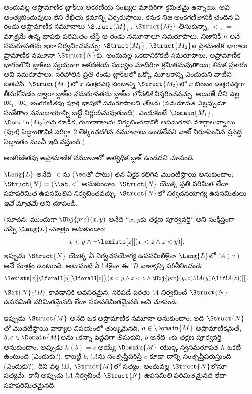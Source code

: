 \documentclass[../../../include/open-logic-section]{subfiles}
\begin{document}
అందువల్ల అప్రామాణిక బ్లాక్‌లు అకరణీయ సంఖ్యల మాదిరిగా క్రమితమై ఉన్నాయి: అవి అంత్యబిందువులు లేని  రేఖీయ క్రమాన్ని ఏర్పరుస్తాయి. కనుక నిజ అంకగణితానికి చెందిన ఏ రెండు  అప్రామాణిక నమూనాలు $\Struct{M}_1$, $\Struct{M_2}$ తీసుకున్నా, $<$, $=$ మాత్రమే ఉన్న భాషకు పరిమితం చేస్తే ఆ రెండు నమూనాలూ సమరూపాలు. నిజానికి $h$ అనే సమరూపతను ఇలా నిర్వచించవచ్చు: $\Struct{M_1}$, $\Struct{M_2}$ల ప్రామాణిక భాగాలు ప్రామాణిక నమూనా $\Struct{N}$కు, అందువల్ల ఒకదానికొకటి సమరూపాలు. అప్రామాణిక భాగంలోని బ్లాక్‌లు స్వయంగా అకరణీయ సంఖ్యల మాదిరిగా క్రమితమవుతాయి; కనుక  ప్రకారం అవి సమరూపాలు. సరిపోలిన ప్రతి రెండు బ్లాక్‌లలో ఒక్కో మూలకాన్ని ఎంచుకుని వాటిని జతచేసి, $\Struct{M_1}$లో $x$ ఉత్తరవర్తి బింబాన్ని $\Struct{M_2}$లో $x$ బింబం ఉత్తరవర్తిగా తీసుకోవడం ద్వారా బ్లాక్‌ల సమరూపతను బ్లాక్‌ల \emph{లోపలికి} విస్తరించవచ్చు. అయితే దీని వల్ల $\mathfrak{M}_1$, $\mathfrak{M}_2$ అంకగణితపు పూర్తి భాషలో సమరూపాలని \emph{తేలదు} (సమరూపత ఎల్లప్పుడూ సంకేతాల సముదాయాన్ని బట్టే నిర్ణయమవుతుంది). ఎందుకంటే $\Domain{M_1}$, $\Domain{M_2}$లపై కూడిక, గుణకారాలను నిర్వచించడానికి అసమరూప మార్గాలున్నాయి. (పూర్తి సిద్ధాంతానికి సరిగ్గా~2 లెక్కించదగిన నమూనాలు ఉండలేవని వాట్ నిరూపించిన ప్రసిద్ధ సిద్ధాంతం నుంచీ ఇది వస్తుంది.)

\begin{prob}
అంకగణితపు అప్రామాణిక నమూనాలో అత్యధిక బ్లాక్ ఉండదని చూపండి.
\end{prob}

\begin{prob}
$\Lang{L}$ అనేది $<$ను ($\eq$తో పాటు) తన ఏకైక  కలిగిన మొదటిస్థాయి  అనుకుందాం; $\Struct{N} = (\Nat,
<)$ అనుకుందాం. $\Struct{N}$ యొక్క ప్రతి పరిమిత లేదా సహపరిమిత ఉపసమితిని నిర్వచించవచ్చు. $\Struct{N}$లో నిర్వచనయోగ్య ఉపసమితులు \emph{ఇవే మాత్రమే} అని చూపండి.

(సూచన: ముందుగా $\Obj{prc}(x,y)$ అనేది ``$x$, $y$కు తక్షణ పూర్వవర్తి'' అని సంక్షిప్తంగా చెప్పే $\Lang{L}$-సూత్రం అనుకుందాం:
\[
x<y \land \lnot \lexists[z][(x<z \land z < y)].
\]
ఇప్పుడు $\Struct{N}$ యొక్క ఏ నిర్వచనయోగ్య ఉపసమితికైనా $\Lang{L}$లో $!A(x)$ అనే సూత్రం ఉంటుంది. అటువంటి ఏ $!A$కైనా ఈ $!D$ వాక్యాన్ని పరిశీలించండి:
\[
\lexists[x][\lforall[y][\lforall[z][((x<y \land x<z \land \Obj{prc}(y,z)
  \land !A(y)) \lif !A(z))]]].
\]
$\Sat{N}{!D}$ కావడానికి అవసరమైన, సరిపడే షరతు $!A$ నిర్వచించే $\Struct{N}$ ఉపసమితి పరిమితమైనది లేదా సహపరిమితమైనది అని చూపండి.

ఇప్పుడు $\Struct{M}$ అనేది ఒక అప్రామాణిక నమూనా అనుకుందాం. అది $\Struct{N}$తో మొదటిస్థాయి వాక్యాల విషయంలో తుల్యమైనది. $a \in \Domain{M}$ అప్రామాణికమైతే, $b, c \in \Domain{M}$లను $a$కన్నా పెద్దవిగా తీసుకుని, $b$ అనేది~$c$కు తక్షణ పూర్వవర్తి అనుకుందాం. అప్పుడు $h(b)=c$ అయ్యే $\Domain{M}$ యొక్క స్వసమరూపత $h$ ఒకటి ఉంటుంది (ఎందుకు?). కాబట్టి $b$, $!A$ను సంతృప్తిపరిస్తే $c$ కూడా దాన్ని సంతృప్తిపరుస్తుంది (ఎందుకు?). దీని వల్ల $!D$, $\Struct{M}$లో సత్యం; అందువల్ల $\Struct{N}$లోనూ సత్యమే. కానీ అప్పుడు $!A$ నిర్వచించే $\Struct{N}$ ఉపసమితి పరిమితమైనది లేదా సహపరిమితమైనది.
\end{prob}
\end{document}
